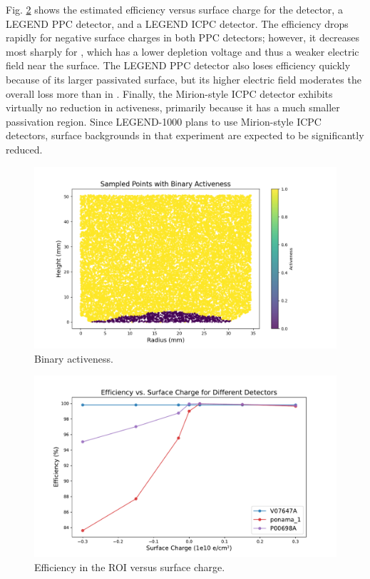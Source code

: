 Fig. \ref{fig:efficiency_sc_plot} shows the estimated efficiency versus surface charge for the {\ponama} detector, a LEGEND PPC detector, and a LEGEND ICPC detector. The efficiency drops rapidly for negative surface charges in both PPC detectors; however, it decreases most sharply for {\ponama}, which has a lower depletion voltage and thus a weaker electric field near the surface. The LEGEND PPC detector also loses efficiency quickly because of its larger passivated surface, but its higher electric field moderates the overall loss more than in {\ponama}. Finally, the Mirion-style ICPC detector exhibits virtually no reduction in activeness, primarily because it has a much smaller passivation region. Since LEGEND-1000 plans to use Mirion-style ICPC detectors, surface backgrounds in that experiment are expected to be significantly reduced.

\begin{figure}[!htb]
\centering
\includegraphics[trim={1.5cm 0cm 6cm 0cm},clip,width=0.9\linewidth]{ch5/figs/bianry_act_ponama_1_-0.03.png}
\caption{Binary activeness.}
\label{ch5:fig:binary_activenss}
\end{figure}

\begin{figure}[!htb]
\includegraphics[trim={1.6cm 0.3cm 2cm 1.8cm},clip,width=\linewidth]{ch5/figs/efficiency_0nbb.pdf}
\caption{Efficiency in the ROI versus surface charge.}
\label{fig:efficiency_sc_plot}
\end{figure}

